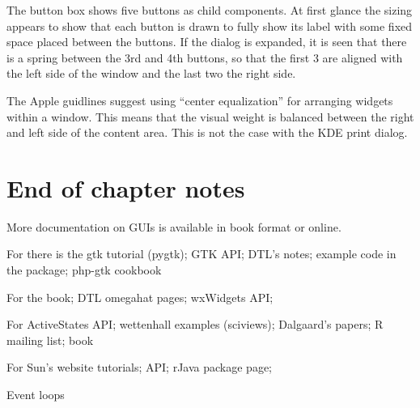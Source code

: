 The button box shows five buttons as child components. At first glance
the sizing appears to show that each button is drawn to fully show its label
with some fixed space placed between the buttons. If the dialog is
expanded, it is seen that there is a spring between the 3rd and 4th
buttons, so that the first 3 are aligned with the left side of the
window and the last two the right side.

The Apple guidlines\citep[Ch. 15]{APPLE:HIG} suggest using ``center
equalization'' for arranging widgets within a window. This means that
the visual weight is balanced between the right and left side of the
content area. This is not the case with the KDE print dialog.





\section{End of chapter notes}
\label{sec:GUI:end-of-chapter}

More documentation on GUIs is available in book format or online. 

For \GTK\/ there is the gtk tutorial (pygtk); GTK API; DTL's notes; example
code in the  package; php-gtk cookbook

For \wxWidgets the book; DTL omegahat pages; wxWidgets API;

For \tcltk\/ ActiveStates API; wettenhall examples (sciviews);
Dalgaard's papers; R mailing list; book

For \Java\/ Sun's website tutorials; API; rJava package page; 

Event loops





